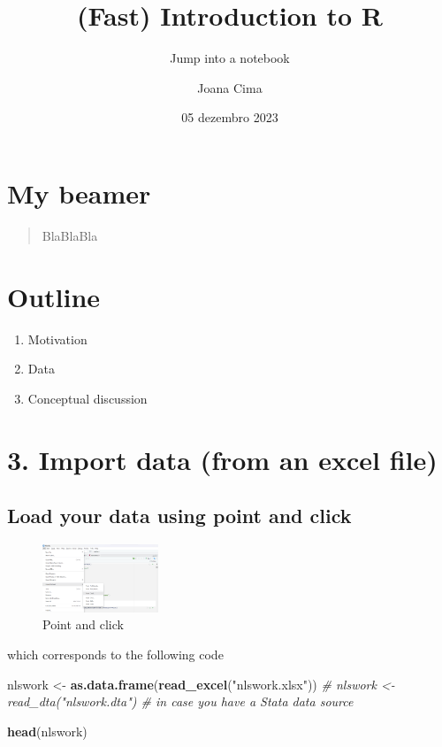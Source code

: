 \documentclass[
]{article}
\title{(Fast) Introduction to R}
\subtitle{Jump into a notebook}
\author{Joana Cima}
\date{05 dezembro 2023}
\newenvironment{Shaded}{\begin{snugshade}}{\end{snugshade}}
\newcommand{\CommentTok}[1]{\textcolor[rgb]{0.56,0.35,0.01}{\textit{#1}}}
\newcommand{\FunctionTok}[1]{\textcolor[rgb]{0.13,0.29,0.53}{\textbf{#1}}}
\newcommand{\NormalTok}[1]{#1}
\newcommand{\OtherTok}[1]{\textcolor[rgb]{0.56,0.35,0.01}{#1}}
\newcommand{\StringTok}[1]{\textcolor[rgb]{0.31,0.60,0.02}{#1}}
\providecommand{\tightlist}{%
  \setlength{\itemsep}{0pt}\setlength{\parskip}{0pt}}
\begin{document}
\maketitle

\hypertarget{my-beamer}{%
\section{My beamer}\label{my-beamer}}

\begin{quote}
BlaBlaBla
\end{quote}

\hypertarget{outline}{%
\section{Outline}\label{outline}}

\begin{enumerate}
\def\labelenumi{\arabic{enumi}.}
\tightlist
\item
  Motivation
\item
  Data
\item
  Conceptual discussion
\end{enumerate}

\hypertarget{import-data-from-an-excel-file}{%
\section{3. Import data (from an excel
file)}\label{import-data-from-an-excel-file}}

\hypertarget{load-your-data-using-point-and-click}{%
\subsection{Load your data using point and
click}\label{load-your-data-using-point-and-click}}

\begin{figure}
\centering
\includegraphics[width=0.31\textwidth,height=\textheight]{importdataset.png}
\caption{Point and click}
\end{figure}

which corresponds to the following code

\begin{Shaded}
\begin{Highlighting}[]
\NormalTok{nlswork }\OtherTok{\textless{}{-}} \FunctionTok{as.data.frame}\NormalTok{(}\FunctionTok{read\_excel}\NormalTok{(}\StringTok{"nlswork.xlsx"}\NormalTok{))}
\CommentTok{\# nlswork \textless{}{-} read\_dta("nlswork.dta") \# in case you have a Stata data source}

\FunctionTok{head}\NormalTok{(nlswork)}
\end{Highlighting}
\end{Shaded}
\end{document}
